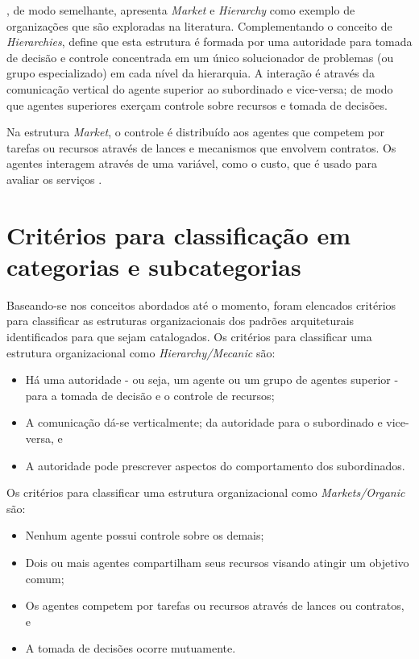 , de modo semelhante, apresenta \textit{Market} e \textit{Hierarchy} como exemplo de organizações que são exploradas na literatura. Complementando o conceito de \textit{Hierarchies},  define que esta estrutura é formada por uma autoridade para tomada de decisão e controle concentrada em um único solucionador de problemas (ou grupo especializado) em cada nível da hierarquia. A interação é através da comunicação vertical do agente superior ao subordinado e vice-versa; de modo que agentes superiores exerçam controle sobre recursos e tomada de decisões.

Na estrutura \textit{Market}, o controle é distribuído aos agentes que competem por tarefas ou recursos através de lances e mecanismos que envolvem contratos. Os agentes interagem através de uma variável, como o custo, que é usado para avaliar os serviços \cite{sycara1998multiagent}.

\section{Critérios para classificação em categorias e subcategorias}

Baseando-se nos conceitos abordados até o momento, foram elencados critérios para classificar as estruturas organizacionais dos padrões arquiteturais identificados para que sejam catalogados. Os critérios para classificar uma estrutura organizacional como \textit{Hierarchy/Mecanic} são:

\begin{itemize}
    \item Há uma autoridade - ou seja, um agente ou um grupo de agentes superior - para a tomada de decisão e o controle de recursos;
    \item A comunicação dá-se verticalmente; da autoridade para o subordinado e vice-versa, e
    \item A autoridade pode prescrever aspectos do comportamento dos subordinados.
\end{itemize}

Os critérios para classificar uma estrutura organizacional como \textit{Markets/Organic} são:

\begin{itemize}
    \item Nenhum agente possui controle sobre os demais;
    \item Dois ou mais agentes compartilham seus recursos visando atingir um objetivo comum;
    \item Os agentes competem por tarefas ou recursos através de lances ou contratos, e
    \item A tomada de decisões ocorre mutuamente.
\end{itemize}

